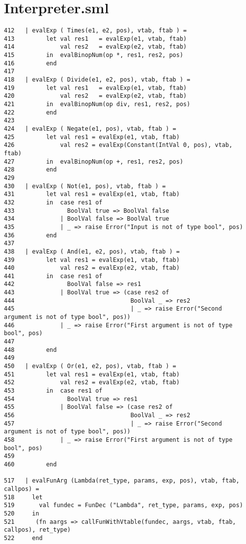 \documentclass[paper=a4, fontsize=11pt]{scrartcl} %
\numberwithin{equation}{section} %
\numberwithin{figure}{section} %
\numberwithin{table}{section} %
\begin{document}
\chapter{Interpreter.sml}
\begin{lstlisting}
412	  | evalExp ( Times(e1, e2, pos), vtab, ftab ) = 
413	        let val res1   = evalExp(e1, vtab, ftab) 
414	            val res2   = evalExp(e2, vtab, ftab) 
415	        in  evalBinopNum(op *, res1, res2, pos) 
416	        end 
417	 
418	  | evalExp ( Divide(e1, e2, pos), vtab, ftab ) = 
419	        let val res1   = evalExp(e1, vtab, ftab) 
420	            val res2   = evalExp(e2, vtab, ftab) 
421	        in  evalBinopNum(op div, res1, res2, pos) 
422	        end 
423	 
424	  | evalExp ( Negate(e1, pos), vtab, ftab ) = 
425	        let val res1 = evalExp(e1, vtab, ftab) 
426	            val res2 = evalExp(Constant(IntVal 0, pos), vtab, ftab) 
427	        in  evalBinopNum(op +, res1, res2, pos) 
428	        end 
429	 
430	  | evalExp ( Not(e1, pos), vtab, ftab ) = 
431	        let val res1 = evalExp(e1, vtab, ftab) 
432	        in  case res1 of 
433	              BoolVal true => BoolVal false 
434	            | BoolVal false => BoolVal true 
435	            | _ => raise Error("Input is not of type bool", pos) 
436	        end 
437	 
438	  | evalExp ( And(e1, e2, pos), vtab, ftab ) = 
439	        let val res1 = evalExp(e1, vtab, ftab) 
440	            val res2 = evalExp(e2, vtab, ftab) 
441	        in  case res1 of 
442	              BoolVal false => res1 
443	            | BoolVal true => (case res2 of 
444	                                BoolVal _ => res2 
445	                                | _ => raise Error("Second argument is not of type bool", pos)) 
446	            | _ => raise Error("First argument is not of type bool", pos) 
447	       
448	        end 
449	 
450	  | evalExp ( Or(e1, e2, pos), vtab, ftab ) = 
451	        let val res1 = evalExp(e1, vtab, ftab) 
452	            val res2 = evalExp(e2, vtab, ftab) 
453	        in  case res1 of 
454	              BoolVal true => res1 
455	            | BoolVal false => (case res2 of 
456	                                BoolVal _ => res2 
457	                                | _ => raise Error("Second argument is not of type bool", pos)) 
458	            | _ => raise Error("First argument is not of type bool", pos) 
459	       
460	        end

517	  | evalFunArg (Lambda(ret_type, params, exp, pos), vtab, ftab, callpos) = 
518	    let 
519	      val fundec = FunDec ("Lambda", ret_type, params, exp, pos) 
520	    in 
521	     (fn aargs => callFunWithVtable(fundec, aargs, vtab, ftab, callpos), ret_type)  
522	    end 
\end{lstlisting}
\end{document}

